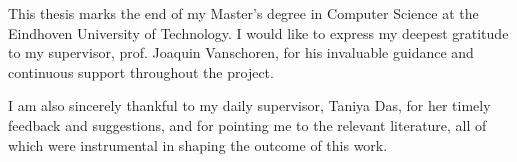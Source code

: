 This thesis marks the end of my Master's degree in Computer Science at the Eindhoven University of Technology. I would like to express my deepest gratitude to my supervisor, prof. Joaquin Vanschoren, for his invaluable guidance and continuous support throughout the project. 

I am also sincerely thankful to my daily supervisor, Taniya Das, for her timely feedback and suggestions, and for pointing me to the relevant literature, all of which were instrumental in shaping the outcome of this work.